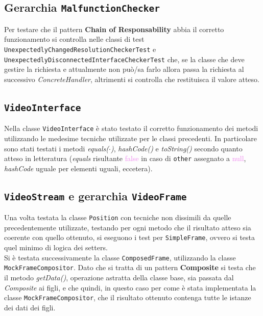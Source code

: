 \documentclass[a4paper,11pt]{article}
\begin{document}
	\subsection{Gerarchia \texttt{MalfunctionChecker}}
	Per testare che il pattern \textbf{Chain of Responsability} abbia il corretto funzionamento si controlla nelle classi di test \texttt{UnexpectedlyChangedResolutionCheckerTest} e \texttt{UnexpectedlyDisconnectedInterfaceCheckerTest} che, se la classe che deve gestire la richiesta e attualmente non può/sa farlo allora passa la richiesta al successivo \textit{ConcreteHandler}, altrimenti si controlla che restituisca il valore atteso.
	
	
	\subsection{\texttt{VideoInterface}}
	Nella classe \texttt{VideoInterface} è stato testato il corretto funzionamento dei metodi utilizzando le medesime tecniche utilizzate per le classi precedenti. In particolare sono stati testati i metodi \textit{equals($\cdot$)}, \textit{hashCode()} e \textit{toString()} secondo quanto atteso in letteratura (\textit{equals} risultante \textcolor{violet}{false} in caso di \texttt{other} assegnato a \textcolor{violet}{null}, \textit{hashCode} uguale per elementi uguali, eccetera).
	
	
	\subsection{\texttt{VideoStream} e gerarchia \texttt{VideoFrame}}
	Una volta testata la classe \texttt{Position} con tecniche non dissimili da quelle precedentemente utilizzate, testando per ogni metodo che il risultato atteso sia coerente con quello ottenuto, si eseguono i test per \texttt{SimpleFrame}, ovvero si testa quel minimo di logica dei setters.\\
	Si è testata successivamente la classe \texttt{ComposedFrame}, utilizzando la classe \texttt{MockFrameCompositor}. Dato che si tratta di un pattern \textbf{Composite} si testa che il metodo \textit{getData()}, operazione astratta della classe base, sia passata dal \textit{Composite} ai figli, e che quindi, in questo caso per come è stata implementata la classe \texttt{MockFrameCompositor}, che il risultato ottenuto contenga tutte le istanze dei dati dei figli.
	
	
\end{document}
